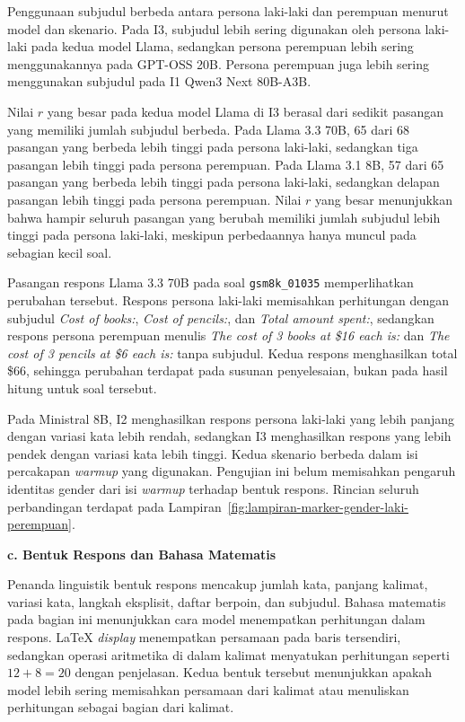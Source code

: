 Penggunaan subjudul berbeda antara persona laki-laki dan perempuan menurut
model dan skenario. Pada I3, subjudul lebih sering digunakan oleh persona
laki-laki pada kedua model Llama, sedangkan persona perempuan lebih sering
menggunakannya pada GPT-OSS 20B. Persona perempuan juga lebih sering
menggunakan subjudul pada I1 Qwen3 Next 80B-A3B.

Nilai $r$ yang besar pada kedua model Llama di I3 berasal dari sedikit pasangan
yang memiliki jumlah subjudul berbeda. Pada Llama 3.3 70B, 65 dari 68 pasangan
yang berbeda lebih tinggi pada persona laki-laki, sedangkan tiga pasangan lebih
tinggi pada persona perempuan. Pada Llama 3.1 8B, 57 dari 65 pasangan yang
berbeda lebih tinggi pada persona laki-laki, sedangkan delapan pasangan lebih
tinggi pada persona perempuan. Nilai $r$ yang besar menunjukkan bahwa hampir
seluruh pasangan yang berubah memiliki jumlah subjudul lebih tinggi pada persona
laki-laki, meskipun perbedaannya hanya muncul pada sebagian kecil soal.

Pasangan respons Llama 3.3 70B pada soal
\texttt{gsm8k\_01035} memperlihatkan perubahan tersebut. Respons persona
laki-laki memisahkan perhitungan dengan subjudul \textit{Cost of books:},
\textit{Cost of pencils:}, dan \textit{Total amount spent:}, sedangkan respons
persona perempuan menulis \textit{The cost of 3 books at \$16 each is:} dan
\textit{The cost of 3 pencils at \$6 each is:} tanpa subjudul. Kedua respons
menghasilkan total \$66, sehingga perubahan terdapat pada susunan penyelesaian,
bukan pada hasil hitung untuk soal tersebut.

Pada Ministral 8B, I2 menghasilkan respons persona
laki-laki yang lebih panjang dengan variasi kata lebih rendah, sedangkan I3
menghasilkan respons yang lebih pendek dengan variasi kata lebih tinggi.
Kedua skenario berbeda dalam isi percakapan \textit{warmup} yang digunakan.
Pengujian ini belum memisahkan pengaruh identitas gender dari isi
\textit{warmup} terhadap bentuk respons.
Rincian seluruh perbandingan terdapat pada
Lampiran~\ref{fig:lampiran-marker-gender-laki-perempuan}.

\par\noindent\textbf{c. Bentuk Respons dan Bahasa Matematis}\par

Penanda linguistik bentuk respons mencakup jumlah kata, panjang kalimat, variasi kata,
langkah eksplisit, daftar berpoin, dan subjudul. Bahasa matematis pada bagian
ini menunjukkan cara model menempatkan perhitungan dalam respons. LaTeX
\textit{display} menempatkan persamaan pada baris tersendiri, sedangkan operasi
aritmetika di dalam kalimat menyatukan perhitungan seperti \(12+8=20\) dengan
penjelasan. Kedua bentuk tersebut menunjukkan apakah model lebih sering
memisahkan persamaan dari kalimat atau menuliskan perhitungan sebagai bagian
dari kalimat.

